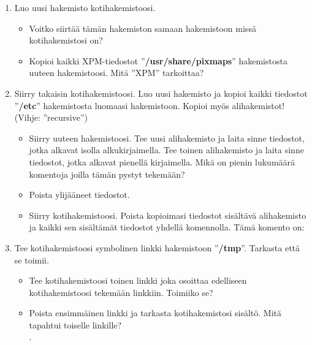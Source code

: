\documentclass[12pt,portrait,a4]{article}
\begin{document}
\begin{enumerate}
\item Luo uusi hakemisto kotihakemistoosi.
	\begin{itemize}
	\item Voitko siirtää tämän hakemiston samaan hakemistoon missä kotihakemistosi on?
\hrulefill
	\item Kopioi kaikki XPM-tiedostot ''\textbf{/usr/share/pixmaps}'' hakemistosta uuteen
hakemistoosi.  Mitä ''XPM'' tarkoittaa? \hrulefill

	\end{itemize}

\item Siirry takaisin kotihakemistoosi.  Luo uusi hakemisto ja kopioi kaikki
tiedostot ''\textbf{/etc}'' hakemistosta luomaasi hakemistoon.  Kopioi myös
alihakemistot!  (Vihje: ''recursive'')
	\begin{itemize}
	\item Siirry uuteen hakemistoosi.  Tee uusi alihakemisto ja laita
sinne tiedostot, jotka alkavat isolla alkukirjaimella.  Tee toinen
alihakemisto ja laita sinne tiedostot, jotka alkavat pienellä kirjaimella. 
Mikä on pienin lukumäärä komentoja joilla tämän pystyt tekemään?  \hrulefill
	\item Poista ylijääneet tiedostot.
	\item Siirry kotihakemistoosi.  Poista kopioimasi tiedostot
sisältävä alihakemisto ja kaikki sen sisältämät tiedostot yhdellä
komennolla.  Tämä komento on: \hrulefill
	\end{itemize}

\item Tee kotihakemistoosi symbolinen linkki hakemistoon ''\textbf{/tmp}''.  Tarkasta
että se toimii.
	\begin{itemize}
	\item Tee kotihakemistoosi toinen linkki joka osoittaa edelliseen kotihakemistoosi
tekemään linkkiin.  Toimiiko se? \hrulefill
	\item Poista ensimmäinen linkki ja tarkasta kotihakemistosi sisältö.
Mitä tapahtui toiselle linkille? \\ . \hrulefill
	\end{itemize}
\end{enumerate}
\end{document}
